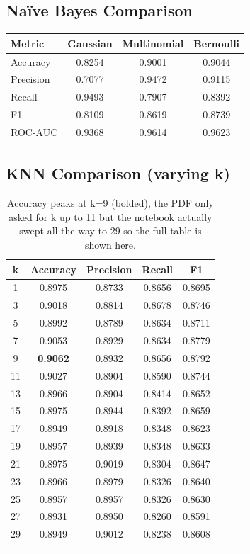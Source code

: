 \documentclass[12pt,a4paper]{article}
\begin{document}
\subsection*{Na\"ive Bayes Comparison}
\begin{tabular}{lccc}
\toprule
Metric & Gaussian & Multinomial & Bernoulli \\
\midrule
Accuracy & 0.8254 & 0.9001 & 0.9044 \\
Precision & 0.7077 & 0.9472 & 0.9115 \\
Recall & 0.9493 & 0.7907 & 0.8392 \\
F1 & 0.8109 & 0.8619 & 0.8739 \\
ROC-AUC & 0.9368 & 0.9614 & 0.9623 \\
\bottomrule
\end{tabular}

\subsection*{KNN Comparison (varying k)}
\begin{longtable}{cccc c}
\toprule
k & Accuracy & Precision & Recall & F1 \\
\midrule
1 & 0.8975 & 0.8733 & 0.8656 & 0.8695 \\
3 & 0.9018 & 0.8814 & 0.8678 & 0.8746 \\
5 & 0.8992 & 0.8789 & 0.8634 & 0.8711 \\
7 & 0.9053 & 0.8929 & 0.8634 & 0.8779 \\
9 & \textbf{0.9062} & 0.8932 & 0.8656 & 0.8792 \\
11 & 0.9027 & 0.8904 & 0.8590 & 0.8744 \\
13 & 0.8966 & 0.8904 & 0.8414 & 0.8652 \\
15 & 0.8975 & 0.8944 & 0.8392 & 0.8659 \\
17 & 0.8949 & 0.8918 & 0.8348 & 0.8623 \\
19 & 0.8957 & 0.8939 & 0.8348 & 0.8633 \\
21 & 0.8975 & 0.9019 & 0.8304 & 0.8647 \\
23 & 0.8966 & 0.8979 & 0.8326 & 0.8640 \\
25 & 0.8957 & 0.8957 & 0.8326 & 0.8630 \\
27 & 0.8931 & 0.8950 & 0.8260 & 0.8591 \\
29 & 0.8949 & 0.9012 & 0.8238 & 0.8608 \\
\bottomrule
\caption{Accuracy peaks at k=9 (bolded), the PDF only asked for k up to 11 but the notebook actually swept all the way to 29 so the full table is shown here.}
\end{longtable}
\end{document}
